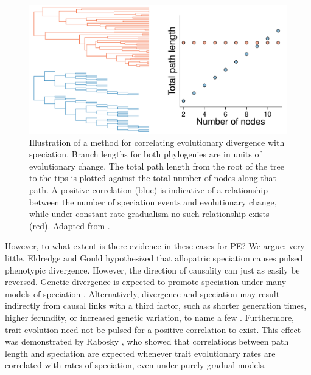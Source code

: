 \begin{figure}[p]
\centering
\includegraphics[width=\textwidth]{figs/Pennell_TREE-fig-box2}
\caption[Phylogenetic correlations between evolutionary divergence and speciation rates]{Illustration of a method for correlating evolutionary divergence with speciation. Branch lengths for both phylogenies are in units of evolutionary change. The total path length from the root of the tree to the tips is plotted against the total number of nodes along that path. A positive correlation (blue) is indicative of a relationship between the number of speciation events and evolutionary change, while under constant-rate gradualism no such relationship exists (red). Adapted from \citep{Pagel2006}.}
\label{fig:pe-box2}
\end{figure} 

However, to what extent is there evidence in these cases for PE? We argue: very little. Eldredge and Gould \citep{EldredgeGould1972} hypothesized that allopatric speciation causes pulsed phenotypic divergence. However, the direction of causality can just as easily be reversed. Genetic divergence is expected to promote speciation under many models of speciation \citep{Nosil2012}. Alternatively, divergence and speciation may result indirectly from causal links with a third factor, such as shorter generation times, higher fecundity, or increased genetic variation, to name a few \citep{Goldie2011}. Furthermore, trait evolution need not be pulsed for a positive correlation to exist. This effect was demonstrated by Rabosky \citep{Rabosky2012}, who showed that correlations between path length and speciation are expected whenever trait evolutionary rates are correlated with rates of speciation, even under purely gradual models. 

